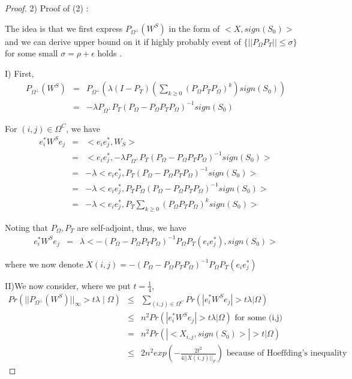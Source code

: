 \documentclass{../common/projectreport}
\begin{document}
\begin{proof}
2) Proof of (2) :

The idea is that we first express $P_{\Omega^{\bot}}(W^{S})$ in the form of $<X,sign(S_{0})>$and we can derive upper bound on it if highly probably event of $\{||P_{\Omega}P_{T}||\le\sigma\}$ for some small $\sigma=\rho+\epsilon$ holds . 

I) First, 
\begin{eqnarray*}
P_{\Omega^{\bot}}(W^{S}) & = & P_{\Omega^{\bot}}(\lambda(I-P_{T})(\sum_{k\ge0}(P_{\Omega}P_{T}P_{\Omega})^{k})sign(S_{0}))\\
 & = & -\lambda P_{\Omega^{\bot}}P_{T}(P_{\Omega}-P_{\Omega}P_{T}P_{\Omega})^{-1}sign(S_{0})
\end{eqnarray*}


For $(i,j)\in\Omega^{C}$, we have 
\begin{eqnarray*}
e_{i}^{*}W^{S}e_{j} & = & <e_{i}e_{j}^{*},W_{S}>\\
 & = & <e_{i}e_{j}^{*},-\lambda P_{\Omega^{\bot}}P_{T}(P_{\Omega}-P_{\Omega}P_{T}P_{\Omega})^{-1}sign(S_{0})>\\
 & = & -\lambda<e_{i}e_{j}^{*},P_{T}(P_{\Omega}-P_{\Omega}P_{T}P_{\Omega})^{-1}sign(S_{0})>\\
 & = & -\lambda<e_{i}e_{j}^{*},P_{T}P_{\Omega}(P_{\Omega}-P_{\Omega}P_{T}P_{\Omega})^{-1}sign(S_{0})>\\
 & = & -\lambda<e_{i}e_{j}^{*},P_{T}\sum_{k\ge0}(P_{\Omega}P_{T}P_{\Omega})^{k}sign(S_{0})>
\end{eqnarray*}


Noting that $P_{\Omega},P_{T}$ are self-adjoint, thus, we have 
\begin{eqnarray*}
e_{i}^{*}W^{S}e_{j} & = & \lambda<-(P_{\Omega}-P_{\Omega}P_{T}P_{\Omega})^{-1}P_{\Omega}P_{T}(e_{i}e_{j}^{*}),sign(S_{0})>
\end{eqnarray*}


where we now denote $X(i,j)=-(P_{\Omega}-P_{\Omega}P_{T}P_{\Omega})^{-1}P_{\Omega}P_{T}(e_{i}e_{j}^{*})$

II)We now consider, where we put $t=\frac{1}{4}$, 
\begin{eqnarray*}
Pr(||P_{\Omega^{\bot}}(W^{S})||_{\infty}>t\lambda\mid\Omega) & \le & \sum_{(i,j)\in\Omega^{C}}Pr(|e_{i}^{*}W^{S}e_{j}|>t\lambda|\Omega)\\
 & \le & n^{2}Pr(|e_{i}^{*}W^{S}e_{j}|>t\lambda|\Omega)\text{ for some (i,j)}\\
 & = & n^{2}Pr(|<X_{i,j},sign(S_{0})>|>t|\Omega)\\
 & \le & 2n^{2}exp(-\frac{2t^{2}}{4||X(i,j)||_{F}})\text{ because of Hoeffding's inequality}
\end{eqnarray*}



\end{proof}
\end{document}
